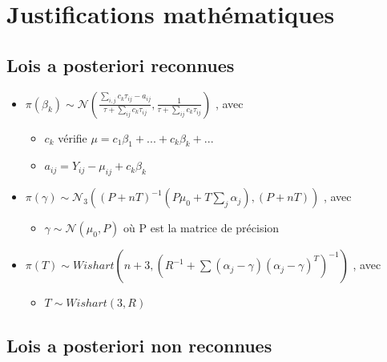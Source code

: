  \section{Justifications mathématiques}
 
   \subsection{Lois a posteriori reconnues}

    \begin{itemize}
    
        \item $\pi(\beta_k)  \sim \mathcal{N} (\frac{\sum_{i,j}c_k \tau_{ij}-a_{ij}}{\tau + \sum_{ij}c_k \tau_{ij}}, \frac{1}{\tau + \sum_{ij}c_k \tau_{ij}})$ , avec
        \begin{itemize}
            \item $c_k$ vérifie $\mu = c_1\beta_1 + ... + c_k\beta_k + ...$
            \item $a_{ij} = Y_{ij} - \mu_{ij} + c_k\beta_k$
        \end{itemize}
        
        \item $\pi(\gamma) \sim \mathcal{N}_3 ((P+nT)^{-1}(P\mu_0 +T\sum_j \alpha_j),(P+nT))$ , avec
        \begin{itemize}
            \item $\gamma \sim \mathcal{N}(\mu_0,P)$ où P est la matrice de précision
        \end{itemize}
        
        \item $\pi(T) \sim Wishart(n+3, (R^{-1}+ \sum(\alpha_j - \gamma)(\alpha_j - \gamma)^T)^{-1})$ , avec
        \begin{itemize}
            \item $T \sim Wishart(3,R)$
        \end{itemize}
        
    \end{itemize}
    
    
    
   \subsection{Lois a posteriori non reconnues}

